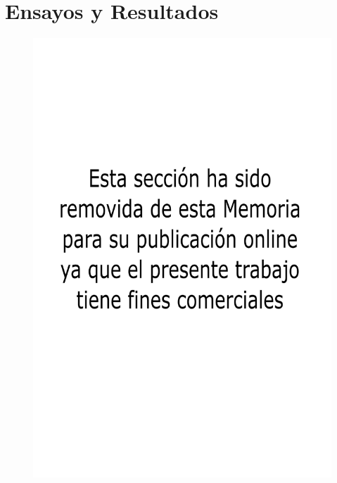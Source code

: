 
\chapter{Ensayos y Resultados} %

\label{Chapter4} %


\begin{figure}[!h]
	\centering
	\includegraphics[width=14cm]{./Figures/comercial.png}
\end{figure}